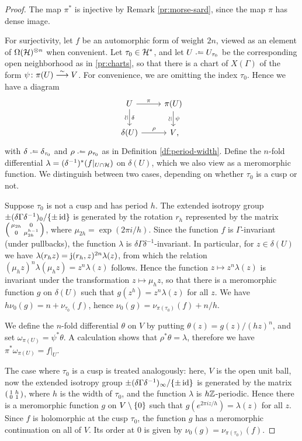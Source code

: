 \begin{proof}
 The map $\pi^*$ is injective by Remark \ref{pr:morse-sard}, since the map $\pi$ has dense image.

 For surjectivity, let $f$ be an automorphic form of weight $2n$, viewed as an element of $\Omega(\mathcal{H})^{\otimes n}$ when convenient. Let $\tau_0\in\mathcal{H}^*$, and let $U\defeq U_{\tau_0}$ be the corresponding open neighborhood as in \ref{pr:charts}, so that there is a chart of $X(\Gamma)$ of the form $\psi\colon \pi(U)\stackrel{\sim}{\longrightarrow} V$. For convenience, we are omitting the index $\tau_0$. Hence we have a diagram
 \[
 \begin{tikzcd}
  U \arrow{r}{\pi} \arrow{d}{\delta}[swap]{\rotatebox{90}{\(\simeq\)}} &
  \pi(U) \arrow{d}{\psi}[swap]{\rotatebox{90}{\(\simeq\)}} \\
  \delta(U) \arrow{r}{\rho} &
  V\rlap{,}
 \end{tikzcd}
 \]
 with $\delta\defeq\delta_{\tau_0}$ and $\rho\defeq\rho_{\tau_0}$ as in Definition \ref{df:period-width}. Define the $n$-fold differential $\lambda=(\delta^{-1})^*(f|_{U\cap\mathcal{H}})$ on $\delta(U)$, which we also view as a meromorphic function. We distinguish between two cases, depending on whether $\tau_0$ is a cusp or not.
 
 Suppose $\tau_0$ is not a cusp and has period $h$. The extended isotropy group $\pm(\delta\Gamma\delta^{-1})_0/\{\pm\operatorname{id}\}$ is generated by the rotation $r_h$ represented by the matrix $\left(\begin{smallmatrix}\mu_{2h}&0\\0&\mu_{2h}^{h-1}\end{smallmatrix}\right)$, where $\mu_{2h}=\exp(2\pi i/h)$. Since the function $f$ is $\Gamma$-invariant (under pullbacks), the function $\lambda$ is $\delta\Gamma\delta^{-1}$-invariant. In particular, for $z\in\delta(U)$ we have $\lambda(r_h z)=\mathrm{j}(r_h,z)^{2n}\lambda(z)$, from which the relation $(\mu_h z)^n\lambda(\mu_h z)=z^n \lambda(z)$ follows. Hence the function $z\mapsto z^n\lambda(z)$ is invariant under the transformation $z\mapsto\mu_h z$, so that there is a meromorphic function $g$ on $\delta(U)$ such that $g(z^h)=z^n\lambda(z)$ for all $z$. We have $h\nu_0(g)=n+\nu_{\tau_0}(f)$, hence $\nu_0(g)=\nu_{\pi(\tau_0)}(f)+n/h$.
 
 We define the $n$-fold differential $\theta$ on $V$ by putting $\theta(z)=g(z)/(hz)^n$, and set $\omega_{\pi(U)}=\psi^*\theta$. A calculation shows that $\rho^*\theta=\lambda$, therefore we have $\pi^*\omega_{\pi(U)}=f|_U$.
 
 The case where $\tau_0$ is a cusp is treated analogously: here, $V$ is the open unit ball, now the extended isotropy group $\pm(\delta\Gamma\delta^{-1})_\infty/\{\pm\operatorname{id}\}$ is generated by the matrix $\left(\begin{smallmatrix}1&h\\0&1\end{smallmatrix}\right)$, where $h$ is the width of $\tau_0$, and the function $\lambda$ is $h\mathbb{Z}$-periodic. Hence there is a meromorphic function $g$ on $V\setminus\{0\}$ such that $g(e^{2\pi i z / h})=\lambda(z)$ for all $z$. Since $f$ is holomorphic at the cusp $\tau_0$, the function $g$ has a meromorphic continuation on all of $V$. Its order at $0$ is given by $\nu_0(g)=\nu_{\pi(\tau_0)}(f)$.
 

\end{proof}
